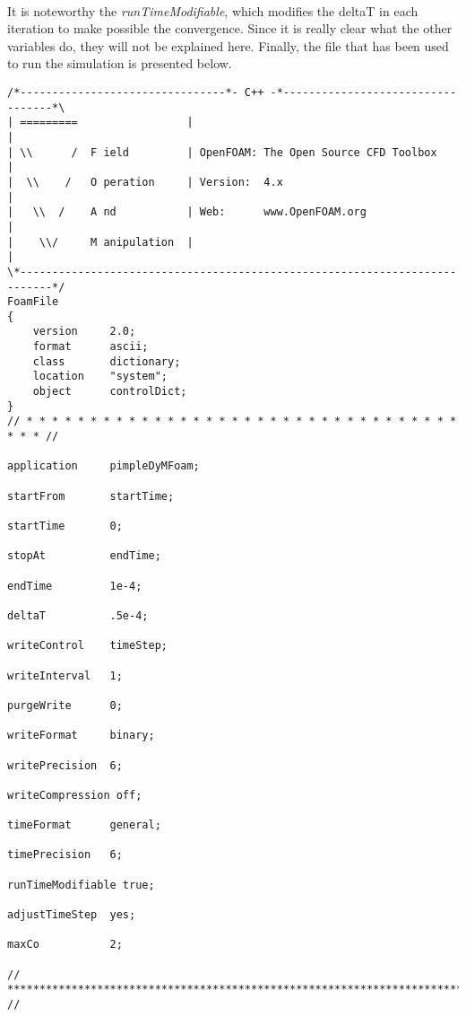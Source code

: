 \paragraph{}It is noteworthy the \textit{runTimeModifiable}, which modifies the deltaT in each iteration to make possible the convergence. Since it is really clear what the other variables do, they will not be explained here. Finally, the file that has been used to run the simulation is presented below.

\begin{footnotesize}
\begin{verbatim}
/*--------------------------------*- C++ -*----------------------------------*\
| =========                 |                                                 |
| \\      /  F ield         | OpenFOAM: The Open Source CFD Toolbox           |
|  \\    /   O peration     | Version:  4.x                                   |
|   \\  /    A nd           | Web:      www.OpenFOAM.org                      |
|    \\/     M anipulation  |                                                 |
\*---------------------------------------------------------------------------*/
FoamFile
{
    version     2.0;
    format      ascii;
    class       dictionary;
    location    "system";
    object      controlDict;
}
// * * * * * * * * * * * * * * * * * * * * * * * * * * * * * * * * * * * * * //

application     pimpleDyMFoam;

startFrom       startTime;

startTime       0;

stopAt          endTime;

endTime         1e-4;

deltaT 		    .5e-4;

writeControl    timeStep;

writeInterval   1;

purgeWrite      0;

writeFormat     binary;

writePrecision  6;

writeCompression off;

timeFormat      general;

timePrecision   6;

runTimeModifiable true;

adjustTimeStep  yes;

maxCo           2;

// ************************************************************************* //

\end{verbatim}
\end{footnotesize}
